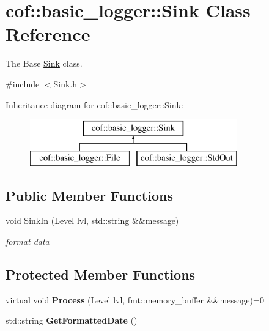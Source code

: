 \hypertarget{classcof_1_1basic__logger_1_1_sink}{}\section{cof\+:\+:basic\+\_\+logger\+:\+:Sink Class Reference}
\label{classcof_1_1basic__logger_1_1_sink}


The Base \hyperlink{classcof_1_1basic__logger_1_1_sink}{Sink} class.  




{\ttfamily \#include $<$Sink.\+h$>$}

Inheritance diagram for cof\+:\+:basic\+\_\+logger\+:\+:Sink\+:\begin{figure}[H]
\begin{center}
\leavevmode
\includegraphics[height=2.000000cm]{classcof_1_1basic__logger_1_1_sink}
\end{center}
\end{figure}
\subsection*{Public Member Functions}
\begin{DoxyCompactItemize}
\item 
void \hyperlink{classcof_1_1basic__logger_1_1_sink_a085f8c690add00cf55ef0754c5900397}{Sink\+In} (Level lvl, std\+::string \&\&message)
\begin{DoxyCompactList}\small\item\em format data \end{DoxyCompactList}\end{DoxyCompactItemize}
\subsection*{Protected Member Functions}
\begin{DoxyCompactItemize}
\item 
\mbox{\label{classcof_1_1basic__logger_1_1_sink_aa95b0d438e4561464ba80ba3312a7ff4}} 
virtual void {\bfseries Process} (Level lvl, fmt\+::memory\+\_\+buffer \&\&message)=0
\item 
\mbox{\label{classcof_1_1basic__logger_1_1_sink_aff876363f1ab16500c493c834f726015}} 
std\+::string {\bfseries Get\+Formatted\+Date} ()
\end{DoxyCompactItemize}
